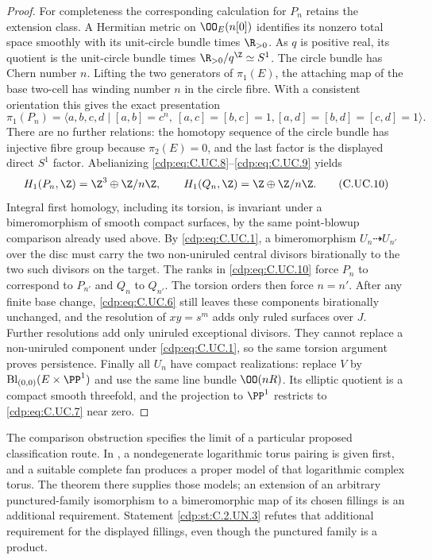 \begin{proof}
For completeness the corresponding calculation
for $P_n$ retains the extension class. A Hermitian
metric on $\OO_E(n[0])$ identifies its nonzero
total space smoothly with its unit-circle bundle
times $\R_{>0}$. As $q$ is positive real, its
quotient is the unit-circle bundle times
$\R_{>0}/q^{\Z}\simeq S^1$. The circle bundle
has Chern number $n$. Lifting the two generators
of $\pi_1(E)$, the attaching map of the base
two-cell has winding number $n$ in the circle
fibre. With a consistent orientation this gives
the exact presentation
\[
 \pi_1(P_n)=
 \langle a,b,c,d\mid
 [a,b]=c^n,\ [a,c]=[b,c]=1,
 [a,d]=[b,d]=[c,d]=1\rangle.
\tag{C.UC.9}\label{cdp:eq:C.UC.9}
\]
There are no further relations: the homotopy
sequence of the circle bundle has injective
fibre group because $\pi_2(E)=0$, and the last
factor is the displayed direct $S^1$ factor.
Abelianizing \eqref{cdp:eq:C.UC.8}--\eqref{cdp:eq:C.UC.9} yields
\[
 H_1(P_n,\Z)=\Z^3\oplus\Z/n\Z,
 \qquad H_1(Q_n,\Z)=\Z\oplus\Z/n\Z.
\tag{C.UC.10}\label{cdp:eq:C.UC.10}
\]
Integral first homology, including its torsion,
is invariant under a bimeromorphism of smooth
compact surfaces, by the same point-blowup
comparison already used above. By \eqref{cdp:eq:C.UC.1},
a bimeromorphism $U_n\dashrightarrow U_{n'}$
over the disc must carry the two non-uniruled
central divisors birationally to the two such
divisors on the target. The ranks in \eqref{cdp:eq:C.UC.10}
force $P_n$ to correspond to $P_{n'}$ and
$Q_n$ to $Q_{n'}$. The torsion orders then
force $n=n'$. After any finite base change,
\eqref{cdp:eq:C.UC.6} still leaves these components
birationally unchanged, and the resolution of
$xy=s^m$ adds only ruled surfaces over $J$.
Further resolutions add only uniruled
exceptional divisors. They cannot replace a
non-uniruled component under \eqref{cdp:eq:C.UC.1}, so
the same torsion argument proves persistence.
Finally all $U_n$ have compact realizations:
replace $V$ by
$\operatorname{Bl}_{(0,0)}(E\times\PP^1)$
and use the same line bundle $\OO(nR)$.
Its elliptic quotient is a compact smooth
threefold, and the projection to $\PP^1$
restricts to \eqref{cdp:eq:C.UC.7} near zero.
\end{proof}

The comparison obstruction specifies the limit
of a particular proposed classification route.
In \cite[Sections~5.1--5.3]{KKN2008}, a
nondegenerate logarithmic torus pairing is
given first, and a suitable complete fan
produces a proper model of that logarithmic
complex torus. The theorem there supplies
those models; an extension of an arbitrary
punctured-family isomorphism to a
bimeromorphic map of its chosen fillings
is an additional requirement. Statement
\ref{cdp:st:C.2.UN.3} refutes that additional requirement
for the displayed fillings, even though
the punctured family is a product.


